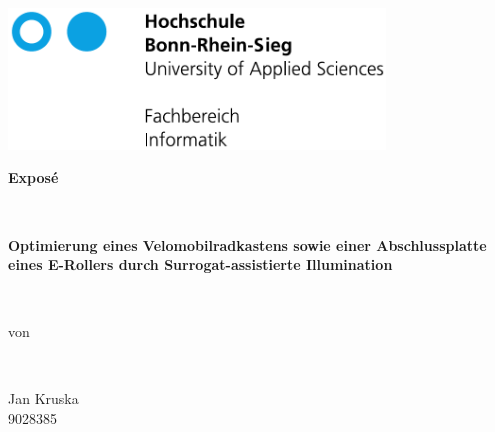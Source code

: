 \documentclass[12pt]{article}
\begin{document}

\begin{titlepage}


  \begin{minipage}[t]{10cm}
  \includegraphics[width=10cm]{h-logo-full-font-embed}\\
  \end{minipage}
  \vspace{2.5cm}

	\begin{center}

    \vspace{0.8cm}

    \vspace{3cm}
    \begin{Huge}
    \textbf{Exposé}\end{Huge}\\
    \vspace{0.8cm}
  	\begin{huge}
  	\textbf{Optimierung eines Velomobilradkastens sowie einer Abschlussplatte eines E-Rollers durch Surrogat-assistierte Illumination}
  	\end{huge}
  	 \vspace{0.6cm} \\
  	  	  \begin{large}von
  	  \end{large}
  	  \\ \begin{LARGE}
  	   \vspace{0.6cm}
  	  {Jan Kruska}\\
  	  9028385\\
  	  \vspace{0.8cm}
  	 
  	\end{LARGE}
  	
    \vspace{3.0cm}
			\end{center}
	\begin{large}


\end{large}
\end{titlepage}
\end{document}
